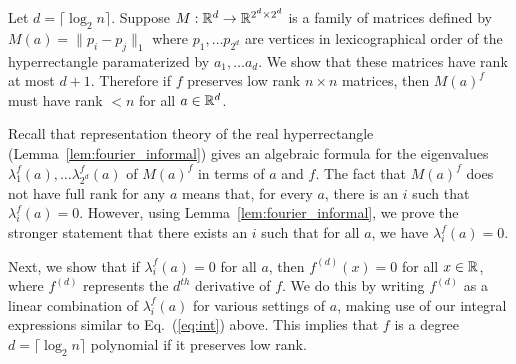 Let $d = \lceil \log_2 n \rceil $. Suppose $M: {\mathbb R}^d \to {\mathbb R}^{2^d \times 2^d}$ is a family of matrices defined by $M(a) = \|p_i - p_j\|_1$ where $p_1, \ldots p_{2^d}$ are vertices in lexicographical order of the hyperrectangle paramaterized by $a_1, \ldots a_d$. We show that these matrices have rank at most $d+1$. Therefore if $f$ preserves low rank $n \times n$ matrices, then $M(a)^f$ must have rank $< n$ for all $a \in {\mathbb R}^d$.   

Recall that representation theory of the real hyperrectangle (Lemma~\ref{lem:fourier_informal}) gives an algebraic formula for the eigenvalues $\lambda_1^f(a), \ldots \lambda_{2^d}^f(a)$ of $M(a)^f$ in terms of $a$ and $f$. The fact that $M(a)^f$ does not have full rank for any $a$ means that, for every $a$, there is an $i$ such that $\lambda_{i}^f(a) = 0$. However, using Lemma~\ref{lem:fourier_informal}, we prove the stronger statement that there exists an $i$ such that for all $a$, we have $\lambda_{i}^f(a) = 0$.

Next, we show that if $\lambda_{i}^f(a) = 0$ for all $a$, then $f^{(d)}(x)=0$ for all $x \in {\mathbb R}$, where $f^{(d)}$ represents the $d^{th}$ derivative of $f$. We do this by writing $f^{(d)}$ as a linear combination of $\lambda^f_{i}(a)$ for various settings of $a$, making use of our integral expressions similar to Eq.~(\ref{eq:int}) above. This implies that $f$ is a degree $d=\lceil \log_2 n \rceil$ polynomial if it preserves low rank.